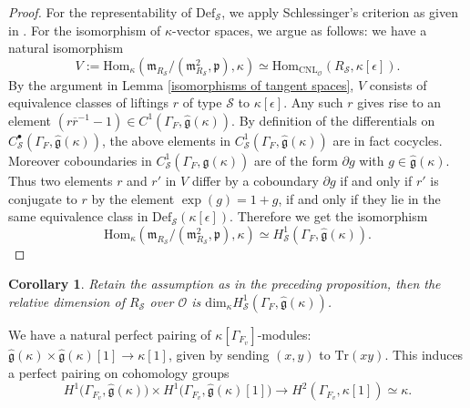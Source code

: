 \documentclass[12pt,oneside,reqno]{amsart}
\theoremstyle{plain}
\newtheorem{corollary}[theorem]{Corollary}
\begin{document}
	\begin{proof}
		For the representability of
		$\mathrm{Def}_\mathcal{S}$,
		we apply
		Schlessinger's criterion
		as given in
		\cite[Theorem 2.11]{Schlessinger1968}.
		For the isomorphism of
		$\kappa$-vector spaces,
		we argue as follows:
		we have a natural isomorphism
		\[
		V:=
		\mathrm{Hom}_\kappa
		(\mathfrak{m}_{R_\mathcal{S}}/
		(\mathfrak{m}_{R_\mathcal{S}}^2,\mathfrak{p}),
		\kappa)
		\simeq
		\mathrm{Hom}_{\mathrm{CNL}_\mathcal{O}}
		(R_\mathcal{S},
		\kappa[\epsilon]).
		\]
		By the argument in
		Lemma
		\ref{isomorphisms of tangent spaces},
		$V$ consists of equivalence classes of liftings
		$r$ of type $\mathcal{S}$
		to
		$\kappa[\epsilon]$.
		Any such
		$r$
		gives rise to an element
		$(r\overline{r}^{-1}-1)
		\in
		C^1(\Gamma_F,
		\widehat{\mathfrak{g}}(\kappa))$.
		By definition of the differentials on
		$C^\bullet_{\mathcal{S}}
		(\Gamma_F,
		\widehat{\mathfrak{g}}(\kappa))$,
		the above elements in
		$C^1_{\mathcal{S}}
		(\Gamma_F,
		\widehat{\mathfrak{g}}(\kappa))$
		are in fact cocycles.
		Moreover coboundaries in
		$C^1_{\mathcal{S}}
		(\Gamma_F,
		\widehat{\mathfrak{g}}(\kappa))$
		are of the form
		$\partial g$
		with
		$g\in
		\widehat{\mathfrak{g}}(\kappa)$.
		Thus two elements
		$r$ and
		$r'$ in $V$
		differ by a coboundary
		$\partial g$
		if and only if
		$r'$ is conjugate to $r$ by
		the element
		$\exp(g)
		=1+g$,
		if and only if they lie in the same
		equivalence class in
		$\mathrm{Def}_\mathcal{S}(\kappa[\epsilon])$.
		Therefore we get the isomorphism
		\[
		\mathrm{Hom}_\kappa
		(\mathfrak{m}_{R_\mathcal{S}}/
		(\mathfrak{m}_{R_\mathcal{S}}^2,\mathfrak{p}),
		\kappa)
		\simeq
		H^1_{\mathcal{S}}
		(\Gamma_F,
		\widehat{\mathfrak{g}}(\kappa)).
		\]
	\end{proof}
	
	
	
	
	
	
	
	\begin{corollary}\label{relative dimension of deformation rings}
		Retain the assumption as in the preceding
		proposition,
		then
		the relative dimension of
		$R_\mathcal{S}$
		over
		$\mathcal{O}$
		is
		$\mathrm{dim}_\kappa
		H^1_{\mathcal{S}}
		(\Gamma_{F},
		\widehat{\mathfrak{g}}(\kappa))$.
	\end{corollary}
	
	
	
	
	
	We have a natural perfect pairing of
	$\kappa[\Gamma_{F_v}]$-modules:
	$\widehat{\mathfrak{g}}(\kappa)
	\times
	\widehat{\mathfrak{g}}(\kappa)[1]
	\rightarrow
	\kappa[1]$,
	given by
	sending
	$(x,y)$
	to
	$\mathrm{Tr}(xy)$.
	This induces a perfect pairing on
	cohomology groups
	\begin{equation}\label{pairing on cohomology groups}
		H^1
		\big(
		\Gamma_{F_v},\widehat{\mathfrak{g}}(\kappa)
		\big)
		\times
		H^1
		\big(
		\Gamma_{F_v},\widehat{\mathfrak{g}}(\kappa)[1]
		\big)
		\rightarrow
		H^2(\Gamma_{F_v},\kappa[1])
		\simeq
		\kappa.
	\end{equation}
	
\end{document}

